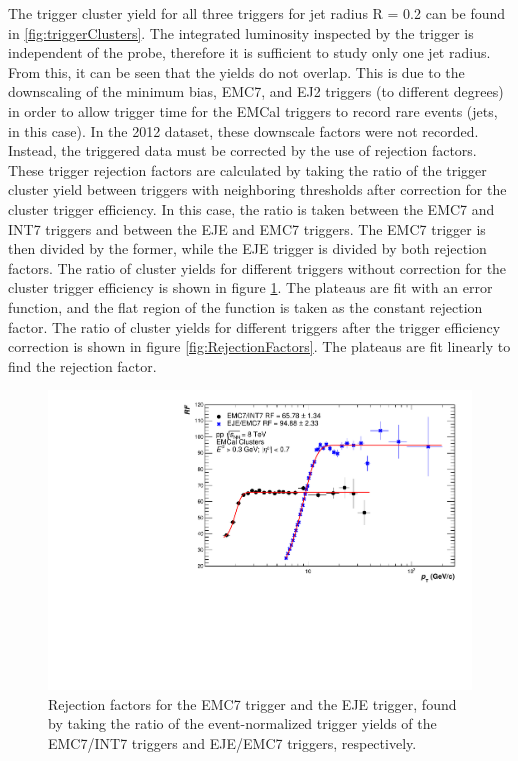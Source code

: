 \documentclass[ALICE]{ALICE_analysis_notes}
\begin{document}
The trigger cluster yield for all three triggers for jet radius R = 0.2 can be found in \ref{fig:triggerClusters}. The integrated luminosity inspected by the trigger is independent of the probe, therefore it is sufficient to study only one jet radius. From this, it can be seen that the yields do not overlap. This is due to the downscaling of the minimum bias, EMC7, and EJ2 triggers (to different degrees) in order to allow trigger time for the EMCal triggers to record rare events (jets, in this case). In the 2012 dataset, these downscale factors were not recorded. Instead, the triggered data must be corrected by the use of rejection factors. These trigger rejection factors are calculated by taking the ratio of the trigger cluster yield between triggers with neighboring thresholds after correction for the cluster trigger efficiency. In this case, the ratio is taken between the EMC7 and INT7 triggers and between the EJE and EMC7 triggers. The EMC7 trigger is then divided by the former, while the EJE trigger is divided by both rejection factors. The ratio of cluster yields for different triggers without correction for the cluster trigger efficiency is shown in figure \ref{fig:RejectionFactorsUnscaled}. The plateaus are fit with an error function, and the flat region of the function is taken as the constant rejection factor. The ratio of cluster yields for different triggers after the trigger efficiency correction is shown in figure \ref{fig:RejectionFactors}. The plateaus are fit linearly to find the rejection factor.

\begin{figure}
    \centering
    \includegraphics[width=15cm]{figures/RejectionFactors/RF_R02_Unscaled.pdf}
    \caption{Rejection factors for the EMC7 trigger and the EJE trigger, found by taking the ratio of the event-normalized trigger yields of the EMC7/INT7 triggers and EJE/EMC7 triggers, respectively.}
    \label{fig:RejectionFactorsUnscaled}
\end{figure}
\end{document}
